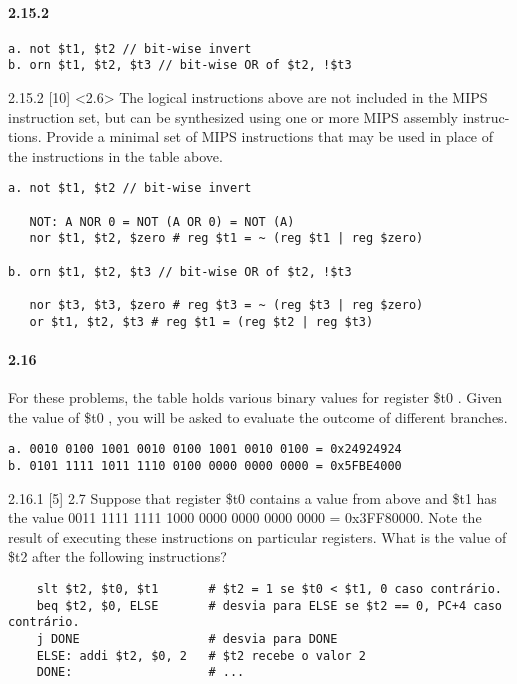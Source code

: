 \documentclass{article}
\begin{document}
\paragraph{2.15.2}

\begin{verbatim}
a. not $t1, $t2 // bit-wise invert
b. orn $t1, $t2, $t3 // bit-wise OR of $t2, !$t3
\end{verbatim}

2.15.2  [10] <2.6> The logical instructions above are not included in the MIPS
instruction set, but can be synthesized using one or more MIPS assembly instruc-
tions. Provide a minimal set of MIPS instructions that may be used in place of 
the instructions in the table above.

\begin{verbatim}
a. not $t1, $t2 // bit-wise invert

   NOT: A NOR 0 = NOT (A OR 0) = NOT (A)
   nor $t1, $t2, $zero # reg $t1 = ~ (reg $t1 | reg $zero)

b. orn $t1, $t2, $t3 // bit-wise OR of $t2, !$t3

   nor $t3, $t3, $zero # reg $t3 = ~ (reg $t3 | reg $zero)
   or $t1, $t2, $t3 # reg $t1 = (reg $t2 | reg $t3)

\end{verbatim}

\paragraph{2.16}
For these problems, the table holds various binary values for register \$t0 . 
Given the value of \$t0 , you will be asked to evaluate the outcome of 
different branches.

\begin{verbatim}
a. 0010 0100 1001 0010 0100 1001 0010 0100 = 0x24924924
b. 0101 1111 1011 1110 0100 0000 0000 0000 = 0x5FBE4000
\end{verbatim}

2.16.1 [5] 2.7 Suppose that register \$t0 contains a value from above and \$t1
has the value 0011 1111 1111 1000 0000 0000 0000 0000 = 0x3FF80000. Note the 
result of executing these instructions on particular registers. What is the 
value of \$t2 after the following instructions?

  \begin{verbatim}
    slt $t2, $t0, $t1       # $t2 = 1 se $t0 < $t1, 0 caso contrário.
    beq $t2, $0, ELSE       # desvia para ELSE se $t2 == 0, PC+4 caso contrário.
    j DONE                  # desvia para DONE
    ELSE: addi $t2, $0, 2   # $t2 recebe o valor 2
    DONE:                   # ...
  \end{verbatim}
\end{document}
